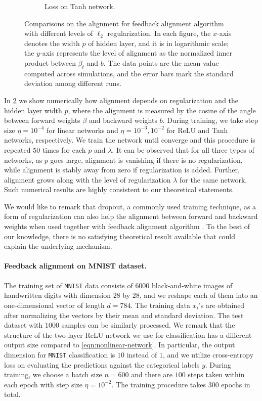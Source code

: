\begin{figure}[h]
\begin{subfigure}[b]{.33\textwidth}
  \caption{Loss on Tanh network.}
  \label{fig:loss_nn_tanh_autograd_l2}
\end{subfigure}
\caption{Comparisons on the alignment for feedback alignment algorithm with different levels of $\ell_2$ regularization. In each figure, the $x$-axis denotes the width $p$ of hidden layer, and it is in logarithmic scale; the $y$-axis represents the level of alignment as the normalized inner product between $\beta_t$ and $b$. The data points are the mean value computed across simulations, and the error bars mark the standard deviation among different runs.}
\label{fig:synthetic-l2}
\end{figure}

In \cref{fig:synthetic-l2} we show numerically how alignment depends on regularization and the hidden layer width $p$, where the alignment is measured by the cosine of the angle between forward weights $\beta$ and backward weights $b$. During training, we take step size $\eta = 10^{-4}$ for linear networks and $\eta = 10^{-3},10^{-2}$ for ReLU and Tanh networks, respectively. We train the network until converge and this procedure is repeated $50$ times for each $p$ and $\lambda$. It can be observed that for all three types of networks, as $p$ goes large, alignment is vanishing if there is no regularization, while alignment is stably away from zero if regularization is added. Further, alignment grows along with the level of regularization $\lambda$ for the same network. Such numerical results are highly consistent to our theoretical statements.

We would like to remark that dropout, a commonly used training technique, as a form of regularization can also help the alignment between forward and backward weights when used together with feedback alignment algorithm \citep{wager2013dropout}. To the best of our knowledge, there is no satisfying theoretical result available that could explain the underlying mechanism.


\paragraph{Feedback alignment on MNIST dataset.}

The training set of \texttt{MNIST} data consists of $6000$ black-and-white images of handwritten digits with dimension $28$ by $28$, and we reshape each of them into an one-dimensional vector of length $d = 784$. The training data $x_i$'s are obtained after normalizing the vectors by their mean and standard deviation. The test dataset with $1000$ samples can be similarly processed. We remark that the structure of the two-layer ReLU network we use for classification has a different output size compared to \eqref{eqn:nonlinear-network}. In particular, the output dimension for \texttt{MNIST} classification is $10$ instead of $1$, and we utilize cross-entropy loss on evaluating the predictions against the categorical labels $y$. During training, we choose a batch size $n = 600$ and there are $100$ steps taken within each epoch with step size $\eta = 10^{-2}$. The training procedure takes $300$ epochs in total. 

